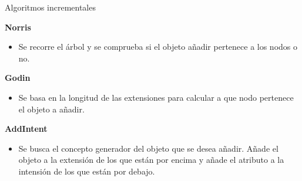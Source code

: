 \documentclass{beamer}
\begin{document}
    \begin{frame}{Algoritmos incrementales}

    \begin{block}{\textbf{Norris}}
    \begin{itemize}
        \item  Se recorre el árbol y se comprueba si el objeto añadir pertenece a los nodos o no. 
    \end{itemize}
    \end{block}
    \pause
    \begin{block}{\textbf{Godin}}
    \begin{itemize}
        \item  Se basa en la longitud de las extensiones para calcular a que nodo pertenece el objeto a añadir.
    \end{itemize}

    \end{block}
    \pause
    \begin{block}{\textbf{AddIntent}}
    \begin{itemize}
        \item  Se busca el concepto generador del objeto que se desea añadir. Añade el objeto a la extensión de los que están por encima y añade el atributo a la intensión de los que están por debajo.
    \end{itemize}

    \end{block}
  \end{frame}
  \fi
\iffalse
\end{document}
